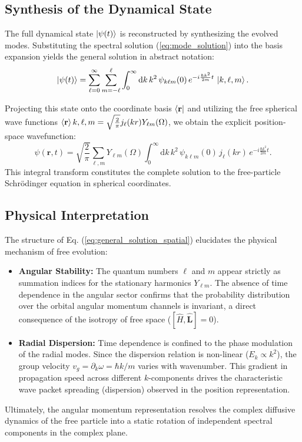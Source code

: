 \subsection{Synthesis of the Dynamical State}

The full dynamical state $\ket{\psi(t)}$ is reconstructed by synthesizing the
evolved modes. Substituting the spectral solution (\ref{eq:mode_solution}) into
the basis expansion yields the general solution in abstract notation:
\begin{equation} \label{eq:general_solution_abstract}
	\ket{\psi(t)} = \sum_{\ell=0}^{\infty} \sum_{m=-\ell}^{\ell}
	\int_{0}^{\infty} \mathrm{d}k \, k^2 \, \psi_{k\ell m}(0) \, e^{-i
	\frac{\hbar k^2}{2m} t} \, \ket{k, \ell, m}.
\end{equation}

Projecting this state onto the coordinate basis $\bra{\mathbf{r}}$ and utilizing
the free spherical wave functions $\braket{\mathbf{r}}{k,\ell,m} =
\sqrt{\frac{2}{\pi}} j_\ell(kr) Y_{\ell m}(\Omega)$, we obtain the explicit
position-space wavefunction:
\begin{equation} \label{eq:general_solution_spatial}
	\psi(\mathbf{r}, t) = \sqrt{\frac{2}{\pi}} \sum_{\ell, m} Y_{\ell m}(\Omega)
	\int_{0}^{\infty} \mathrm{d}k \, k^2 \, \psi_{k\ell m}(0) \, j_\ell(kr) \,
	e^{-i \frac{\hbar k^2}{2m} t}.
\end{equation}
This integral transform constitutes the complete solution to the free-particle
Schrödinger equation in spherical coordinates.

\subsection{Physical Interpretation}

The structure of Eq. (\ref{eq:general_solution_spatial}) elucidates the
physical mechanism of free evolution:
\begin{itemize}
	\item \textbf{Angular Stability:} The quantum numbers $\ell$ and $m$ appear
		strictly as summation indices for the stationary harmonics $Y_{\ell m}$. The
		absence of time dependence in the angular sector confirms that the
		probability distribution over the orbital angular momentum channels is
		invariant, a direct consequence of the isotropy of free space ($[\hat{H},
		\hat{\mathbf{L}}] = 0$).
	\item \textbf{Radial Dispersion:} Time dependence is confined to the phase
		modulation of the radial modes. Since the dispersion relation is non-linear
		($E_k \propto k^2$), the group velocity $v_g = \partial_k \omega = \hbar
		k/m$ varies with wavenumber. This gradient in propagation speed across
		different $k$-components drives the characteristic wave packet spreading
		(dispersion) observed in the position representation.
\end{itemize}
Ultimately, the angular momentum representation resolves the complex diffusive
dynamics of the free particle into a static rotation of independent spectral
components in the complex plane.
